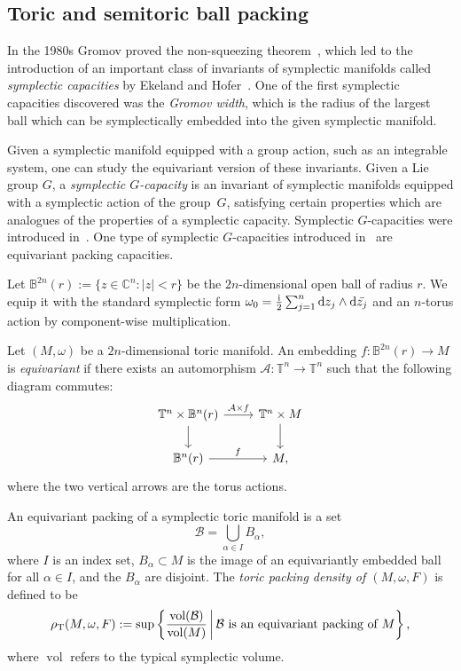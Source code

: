 \documentclass[pdftex]{sigma}
\numberwithin{equation}{section}
\def\C{{\mathbb C}}
\newcommand{\om}{\omega}
\begin{document}
\subsection{Toric and semitoric ball packing}

In the 1980s Gromov proved the non-squeezing theorem~\cite{Gromov1985}, which led to the introduction of an important class of invariants of symplectic manifolds called \emph{symplectic capacities} by Ekeland and Hofer~\cite{EkHo1989, Hocap1990}.
One of the first symplectic capacities discovered was the \emph{Gromov width}, which is the radius of the largest ball which can be symplectically embedded into the given symplectic manifold.

Given a symplectic manifold equipped with a group action, such as an integrable system, one can study the equivariant version of these invariants.
Given a Lie group $G$, a \emph{symplectic $G$-capacity} is an invariant of symplectic manifolds equipped with a symplectic action of the group~$G$, satisfying certain properties which are analogues of the properties of a symplectic capacity.
Symplectic $G$-capacities were introduced in~\cite{FiPaPe2016}.
One type of symplectic $G$-capacities introduced in~\cite{FiPaPe2016} are equivariant packing capacities.

Let $\mathbb{B}^{2n}(r) :=\{z \in \C^n\colon |z| < r\}$ be the $2n$-dimensional open ball of radius $r$. We equip it with the standard symplectic form $\om_0 = \frac{\mathrm{i}}{2} \sum_{j=1}^n {\rm d}z_j \wedge {\rm d}\bar{z_j}$ and an $n$-torus action by component-wise multiplication.

\begin{Definition} \label{def:equivariantembed}
Let $(M,\om)$ be a $2n$-dimensional toric manifold. An embedding $f\colon \mathbb{B}^{2n}(r) \to M $ is \emph{equivariant} if there exists an automorphism $\mathcal{A}\colon \mathbb{T}^n \to \mathbb{T}^n$ such that the following diagram commutes:
\[
\begin{tikzcd}
\mathbb{T}^n \times \mathbb{B}^n(r) \arrow[r, "\mathcal{A} \times f"] \arrow[d]
& \mathbb{T}^n \times M \arrow[d ] \\
\mathbb{B}^n(r) \arrow[r, "f" ]
& M,
\end{tikzcd}
\]
where the two vertical arrows are the torus actions.
\end{Definition}



An equivariant packing of a symplectic toric manifold is a set
\[
 \mathcal{B} = \bigcup_{\alpha\in I} B_\alpha,
\]
where $I$ is an index set, $B_\alpha\subset M$ is the image of an equivariantly embedded ball for all $\alpha\in I$, and the $B_\alpha$ are disjoint.
The \emph{toric packing density of $(M,\om,F)$} is defined to be
\begin{equation}\label{eqn:maximal-toric-packing}
 \rho_{{\rm T}}(M,\om,F) := \mathrm{sup} \left\{\frac{\text{vol}(\mathcal{B})}{\text{vol}(M)} \,  \bigg| \,  \mathcal{B} \text{ is an equivariant packing of $M$}\right\},
\end{equation}
where $\operatorname{vol}$ refers to the typical symplectic volume.
\end{document}
